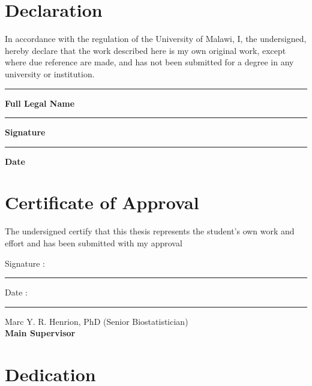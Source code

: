 
\setcounter{chapter}{0}
\setcounter{secnumdepth}{0}
\cfoot{\thepage}

\sectionfont{\centering\MakeUppercase}

\thispagestyle{empty}

\chapter*{Declaration}

In accordance with the regulation of the University of Malawi, I, the undersigned, hereby declare that the work described here is my own original work, except where due reference are made, and has not been submitted for a degree in any university or institution.

\begin{center}
\rule{10cm}{0.2mm}

{\bfseries Full Legal Name}

\vspace*{3cm}

\rule{10cm}{0.2mm}

{\bfseries Signature}

\vspace*{3cm}

\rule{10cm}{0.2mm}

{\bfseries Date}

\end{center}

\newpage

\thispagestyle{empty}

\chapter*{Certificate of Approval}

The undersigned certify that this thesis represents the student’s own work and effort and has been submitted with my approval

Signature : \rule{5cm}{0.2mm}    Date : \rule{5cm}{0.2mm}

Marc Y. R. Henrion, PhD (Senior Biostatistician)\\
\textbf{Main Supervisor}

\newpage

\thispagestyle{empty}

\chapter*{Dedication}

